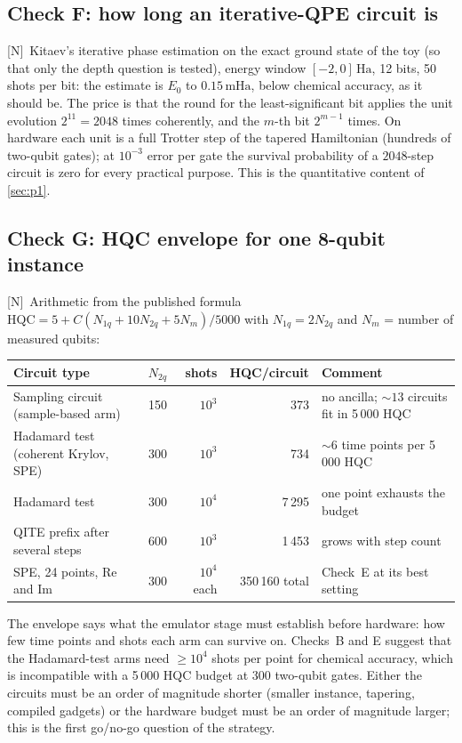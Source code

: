 \documentclass[11pt,a4paper]{article}
\newcommand{\mHa}{\,\mathrm{mHa}}
\newcommand{\Ha}{\,\mathrm{Ha}}
\newcommand{\HQC}{\mathrm{HQC}}
\newcommand{\lN}{\textcolor{keyblue}{[N]}}   %
\begin{document}
\subsection{Check F: how long an iterative-QPE circuit is}
\lN\ Kitaev's iterative phase estimation on the exact ground state of the toy (so that only the depth question is tested), energy window $[-2,0]\Ha$, 12 bits, 50 shots per bit: the estimate is $E_0$ to $0.15\mHa$, below chemical accuracy, as it should be. The price is that the round for the least-significant bit applies the unit evolution $2^{11}=2048$ times coherently, and the $m$-th bit $2^{m-1}$ times. On hardware each unit is a full Trotter step of the tapered Hamiltonian (hundreds of two-qubit gates); at $10^{-3}$ error per gate the survival probability of a $2048$-step circuit is zero for every practical purpose. This is the quantitative content of \cref{sec:p1}.

\subsection{Check G: HQC envelope for one 8-qubit instance}
\lN\ Arithmetic from the published formula $\HQC=5+C(N_{1q}+10N_{2q}+5N_m)/5000$ with $N_{1q}=2N_{2q}$ and $N_m$ = number of measured qubits:
\begin{center}\small
\begin{tabularx}{\linewidth}{@{}L{4.6cm}rrrY@{}}
\toprule
Circuit type & $N_{2q}$ & shots & HQC/circuit & Comment\\\midrule
Sampling circuit (sample-based arm) & 150 & $10^3$ & 373 & no ancilla; $\sim13$ circuits fit in 5\,000 HQC\\
Hadamard test (coherent Krylov, SPE) & 300 & $10^3$ & 734 & $\sim6$ time points per 5\,000 HQC\\
Hadamard test & 300 & $10^4$ & 7\,295 & one point exhausts the budget\\
QITE prefix after several steps & 600 & $10^3$ & 1\,453 & grows with step count\\
SPE, 24 points, Re and Im & 300 & $10^4$ each & 350\,160 total & Check~E at its best setting\\
\bottomrule
\end{tabularx}
\end{center}
The envelope says what the emulator stage must establish before hardware: how few time points and shots each arm can survive on. Checks~B and E suggest that the Hadamard-test arms need $\ge10^4$ shots per point for chemical accuracy, which is incompatible with a 5\,000 HQC budget at 300 two-qubit gates. Either the circuits must be an order of magnitude shorter (smaller instance, tapering, compiled gadgets) or the hardware budget must be an order of magnitude larger; this is the first go/no-go question of the strategy.
\end{document}
